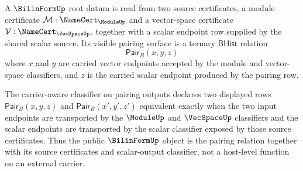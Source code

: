 \begin{definition}
\label{def:bilinform-root-pairing-surface}
A $\BilinFormUp$ root datum is read from two source certificates, a module certificate $\mathcal{M}:\NameCert_{\ModuleUp}$ and a vector-space certificate $\mathcal{V}:\NameCert_{\VecSpaceUp}$, together with a scalar endpoint row supplied by the shared scalar source. Its visible pairing surface is a ternary $\mathsf{BHist}$ relation
$$
\mathsf{Pair}_{B}(x,y,z)
$$
where $x$ and $y$ are carried vector endpoints accepted by the module and vector-space classifiers, and $z$ is the carried scalar endpoint produced by the pairing row.

The carrier-aware classifier on pairing outputs declares two displayed rows $\mathsf{Pair}_{B}(x,y,z)$ and $\mathsf{Pair}_{B}(x',y',z')$ equivalent exactly when the two input endpoints are transported by the $\ModuleUp$ and $\VecSpaceUp$ classifiers and the scalar endpoints are transported by the scalar classifier exposed by those source certificates. Thus the public $\BilinFormUp$ object is the pairing relation together with its source certificates and scalar-output classifier, not a host-level function on an external carrier.
\end{definition}

